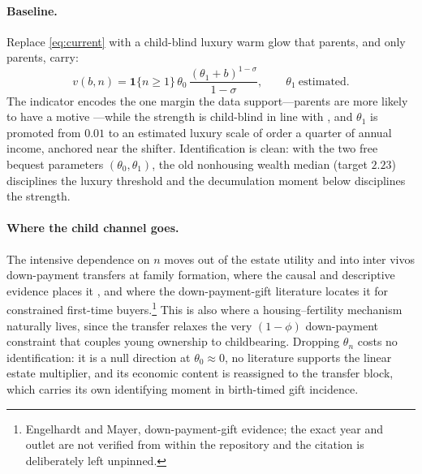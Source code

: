 \documentclass[10pt]{article}
\newcommand{\one}{\mathbf{1}}
\begin{document}
\paragraph{Baseline.} Replace \eqref{eq:current} with a child-blind luxury
warm glow that parents, and only parents, carry:
%
\begin{equation}
v(b,n)=\one\{n\ge 1\}\,\theta_0\,
\frac{(\theta_1+b)^{1-\sigma}}{1-\sigma},
\qquad \theta_1\ \text{estimated.}
\label{eq:baseline}
\end{equation}
%
The indicator encodes the one margin the data support---parents are more
likely to have a motive \citep{kopczuk2007,hurd1989}---while the strength is
child-blind in line with \citet{denardi2004,denardi2025,nakajima2017}, and
$\theta_1$ is promoted from $0.01$ to an estimated luxury scale of order a
quarter of annual income, anchored near the \citet{nakajima2017} shifter.
Identification is clean: with the two free bequest parameters
$(\theta_0,\theta_1)$, the old nonhousing wealth median (target $2.23$)
disciplines the luxury threshold and the decumulation moment below disciplines
the strength.

\paragraph{Where the child channel goes.} The intensive dependence on $n$
moves out of the estate utility and into inter vivos down-payment transfers at
family formation, where the causal and descriptive evidence places it
\citep{kvaerner2023,mcgarry1999}, and where the down-payment-gift literature
locates it for constrained first-time buyers.\footnote{Engelhardt and Mayer,
down-payment-gift evidence; the exact year and outlet are not verified from
within the repository and the citation is deliberately left unpinned.} This is
also where a housing--fertility mechanism naturally lives, since the transfer
relaxes the very $(1-\phi)$ down-payment constraint that couples young
ownership to childbearing. Dropping $\theta_n$ costs no identification: it is a
null direction at $\theta_0\approx0$, no literature supports the linear estate
multiplier, and its economic content is reassigned to the transfer block,
which carries its own identifying moment in birth-timed gift incidence.
\end{document}

